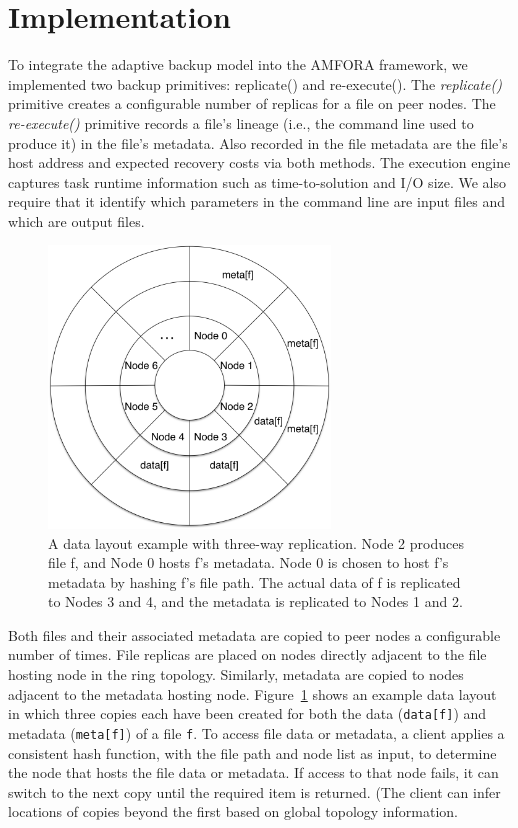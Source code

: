 \documentclass{sig-alternate}
\begin{document}
\section{Implementation}
\label{sec:Impl}
To integrate the adaptive backup model into the AMFORA framework, we implemented two backup primitives: replicate() and re-execute(). The {\em replicate()} primitive creates a configurable number of replicas for a file on peer nodes. The {\em re-execute()} primitive records a file's lineage (i.e., the command line used to produce it) in the file's metadata. Also recorded in the file metadata are the file's host address and expected recovery costs via both methods.
The execution engine captures task runtime information such as time-to-solution and I/O size. We also require that it
identify which parameters in the command line are input files and which are output files.

\begin{figure}[ht]
	\begin{center}
		\includegraphics[width=75mm]{pictures/datalayout}
		\caption{A data layout example with three-way replication. Node 2 produces file f, and Node 0 hosts f's
		metadata. Node 0 is chosen to host f's metadata by hashing f's file path. The actual data of f is replicated to Nodes 3 and 4, and the metadata is replicated
		to Nodes 1 and 2.
		\label{fig:datalayout}}
  	\end{center}
\end{figure}

Both files and their associated metadata are copied to peer nodes a configurable number of times.
File replicas are placed on nodes directly adjacent to the file hosting node in the ring topology.
Similarly, metadata are copied to nodes adjacent to the metadata hosting node.
Figure~\ref{fig:datalayout} shows an example data layout in which three copies each have been
created for both the data ({\tt data[f]}) and metadata ({\tt meta[f]}) of a file {\tt f}.
To access file data or metadata, a client applies a consistent hash function, with the file path and node list as input, to determine the node that hosts the file data or metadata. If access to that node fails, it can switch to the next copy until the required item is returned. (The client can infer locations of copies beyond the first based on global topology information.
\end{document}
